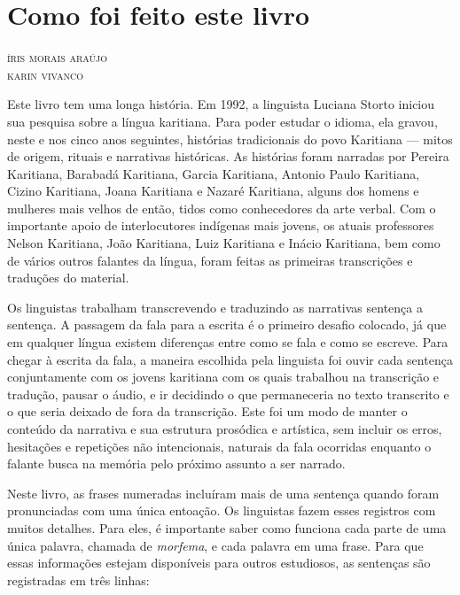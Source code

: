 \chapter{Como foi feito este livro}

\begin{flushright}
\textsc{íris morais araújo}\\
\textsc{karin vivanco}
\end{flushright}

\noindent{}Este livro tem uma longa história. Em 1992, a linguista Luciana Storto
iniciou sua pesquisa sobre a língua karitiana. Para poder estudar o
idioma, ela gravou, neste e nos cinco anos seguintes, histórias
tradicionais do povo Karitiana --- mitos de origem, rituais e narrativas
históricas. As histórias foram narradas por Pereira Karitiana, Barabadá
Karitiana, Garcia Karitiana, Antonio Paulo Karitiana, Cizino Karitiana,
Joana Karitiana e Nazaré Karitiana, alguns dos homens e mulheres mais
velhos de então, tidos como conhecedores da arte verbal. Com o
importante apoio de interlocutores indígenas mais jovens, os atuais
professores Nelson Karitiana, João Karitiana, Luiz Karitiana e Inácio
Karitiana, bem como de vários outros falantes da língua, foram feitas as
primeiras transcrições e traduções do material.

Os linguistas trabalham transcrevendo e traduzindo as narrativas
sentença a sentença. A passagem da fala para a escrita é o primeiro
desafio colocado, já que em qualquer língua existem diferenças entre
como se fala e como se escreve. Para chegar à escrita da fala, a maneira
escolhida pela linguista foi ouvir cada sentença conjuntamente com os
jovens karitiana com os quais trabalhou na transcrição e tradução,
pausar o áudio, e ir decidindo o que permaneceria no texto transcrito e
o que seria deixado de fora da transcrição. Este foi um modo de manter o
conteúdo da narrativa e sua estrutura prosódica e artística, sem incluir
os erros, hesitações e repetições não intencionais, naturais da fala
ocorridas enquanto o falante busca na memória pelo próximo assunto a ser
narrado.

Neste livro, as frases numeradas incluíram mais de uma sentença quando
foram pronunciadas com uma única entoação. Os linguistas fazem esses
registros com muitos detalhes. Para eles, é importante saber como
funciona cada parte de uma única palavra, chamada de \textit{morfema}, e
cada palavra em uma frase. Para que essas informações estejam
disponíveis para outros estudiosos, as sentenças são registradas em três
linhas: 

